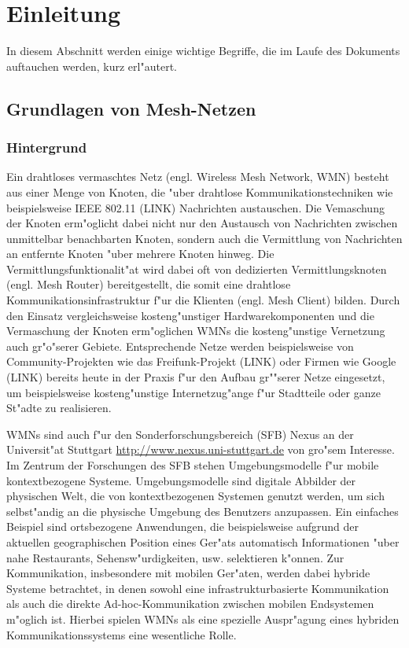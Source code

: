 \section{Einleitung}

In diesem Abschnitt werden einige wichtige Begriffe, die im Laufe des
Dokuments auftauchen werden, kurz erl"autert.

\subsection{Grundlagen von Mesh-Netzen}

\subsubsection{Hintergrund}

Ein drahtloses vermaschtes Netz (engl. Wireless Mesh Network, WMN) besteht
aus einer Menge von Knoten, die "uber drahtlose Kommunikationstechniken
wie beispielsweise IEEE 802.11 (LINK) Nachrichten austauschen. Die
Vemaschung der Knoten erm"oglicht dabei nicht nur den Austausch von
Nachrichten zwischen unmittelbar benachbarten Knoten, sondern auch die
Vermittlung von Nachrichten an entfernte Knoten "uber mehrere Knoten
hinweg. Die Vermittlungsfunktionalit"at wird dabei oft von dedizierten
Vermittlungsknoten (engl. Mesh Router) bereitgestellt, die somit eine
drahtlose Kommunikationsinfrastruktur f"ur die Klienten (engl. Mesh
Client) bilden. Durch den Einsatz vergleichsweise kosteng"unstiger
Hardwarekomponenten und die Vermaschung der Knoten erm"oglichen WMNs die
kosteng"unstige Vernetzung auch gr"o"serer Gebiete. Entsprechende Netze
werden beispielsweise von Community-Projekten wie das Freifunk-Projekt (LINK)
oder Firmen wie Google (LINK) bereits heute in der Praxis f"ur den Aufbau gr""serer
Netze eingesetzt, um beispielsweise kosteng"unstige Internetzug"ange f"ur
Stadtteile oder ganze St"adte zu realisieren.

WMNs sind auch f"ur den Sonderforschungsbereich (SFB) Nexus an der
Universit"at Stuttgart
\url{http://www.nexus.uni-stuttgart.de} von gro"sem Interesse. Im
Zentrum der Forschungen des SFB stehen Umgebungsmodelle f"ur mobile
kontextbezogene Systeme. Umgebungsmodelle sind digitale Abbilder der
physischen Welt, die von kontextbezogenen Systemen genutzt werden, um
sich selbst"andig an die physische Umgebung des Benutzers anzupassen. Ein
einfaches Beispiel sind ortsbezogene Anwendungen, die beispielsweise
aufgrund der aktuellen geographischen Position eines Ger"ats automatisch
Informationen "uber nahe Restaurants, Sehensw"urdigkeiten, usw. selektieren
k"onnen. Zur Kommunikation, insbesondere mit mobilen Ger"aten, werden dabei
hybride Systeme betrachtet, in denen sowohl eine infrastrukturbasierte
Kommunikation als auch die direkte Ad-hoc-Kommunikation zwischen
mobilen Endsystemen m"oglich ist. Hierbei spielen WMNs als eine spezielle
Auspr"agung eines hybriden Kommunikationssystems eine wesentliche Rolle.


